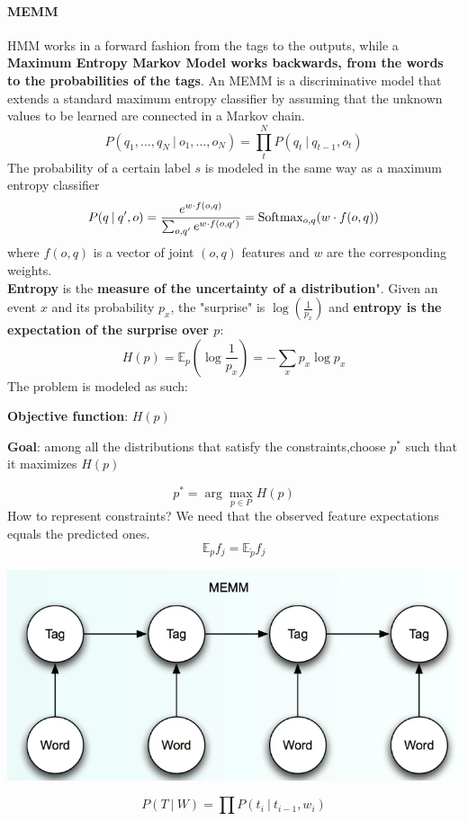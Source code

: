 \documentclass[10pt]{report}
\begin{document}
\paragraph{MEMM} HMM works in a forward fashion from the tags to the outputs, while a \textbf{Maximum Entropy Markov Model works backwards, from the words to the probabilities of the tags}. An MEMM is a discriminative model that extends a standard maximum entropy classifier by assuming that the unknown values to be learned are connected in a Markov chain.
$$P(q_1,\ldots,q_N\:|\:o_1,\ldots,o_N)=\prod_t^N P(q_t\:|\:q_{t-1},o_t)$$
The probability of a certain label $s$ is modeled in the same way as a maximum entropy classifier $$P(q\:|\:q',o)=\frac{e^{w\cdot f(o,q)}}{\sum_{o,q'}e^{w\cdot f(o,q')}}=\hbox{Softmax}_{o,q}(w\cdot f(o,q))$$
where $f(o,q)$ is a vector of joint $(o,q)$ features and $w$ are the corresponding weights.\\
\textbf{Entropy} is the \textbf{measure of the uncertainty of a distribution}". Given an event $x$ and its probability $p_x$, the "surprise" is $\log\left(\frac{1}{p_x}\right)$ and \textbf{entropy is the expectation of the surprise over $p$}:
$$H(p) = \mathbb{E}_p\left(\log\frac{1}{p_x}\right) = -\sum_xp_x\log p_x$$
The problem is modeled as such:
\begin{list}{}{}
	\item \textbf{Objective function}: $H(p)$
	\item \textbf{Goal}: among all the distributions that satisfy the constraints,choose $p^*$ such that it maximizes $H(p)$
\end{list}
$$p^* = \arg\max_{p\in P} H(p)$$
How to represent constraints? We need that the observed feature expectations equals the predicted ones.
$$\mathbb{E}_p f_j = \mathbb{E}_{\tilde{p}}f_j$$
\begin{center}
	\includegraphics[scale=0.5]{16.png}
\end{center}
$$P(T\:|\:W) = \prod P(t_i\:|\:t_{i-1}, w_i)$$
\end{document}
